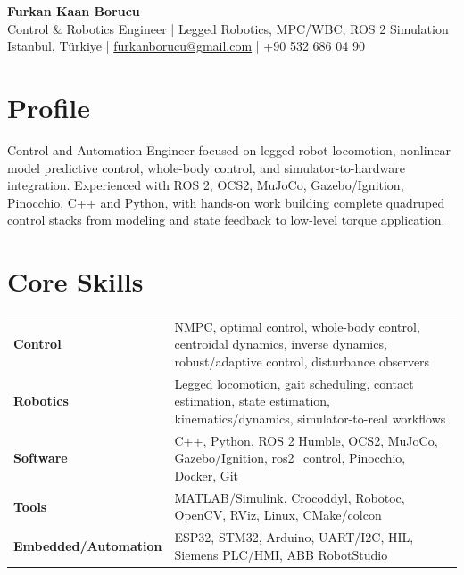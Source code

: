 \documentclass[10pt,a4paper]{article}
\begin{document}
\small

\begin{center}
{\Large \textbf{Furkan Kaan Borucu}}\\[-1pt]
Control \& Robotics Engineer | Legged Robotics, MPC/WBC, ROS 2 Simulation\\[-1pt]
Istanbul, Türkiye \;|\; \href{mailto:furkanborucu@gmail.com}{furkanborucu@gmail.com} \;|\; +90 532 686 04 90
\end{center}
\vspace{-5pt}

\section*{Profile}
Control and Automation Engineer focused on legged robot locomotion, nonlinear model predictive control, whole-body control, and simulator-to-hardware integration. Experienced with ROS 2, OCS2, MuJoCo, Gazebo/Ignition, Pinocchio, C++ and Python, with hands-on work building complete quadruped control stacks from modeling and state feedback to low-level torque application.

\section*{Core Skills}
\begin{tabularx}{\textwidth}{@{}l X@{}}
\textbf{Control} & NMPC, optimal control, whole-body control, centroidal dynamics, inverse dynamics, robust/adaptive control, disturbance observers \\
\textbf{Robotics} & Legged locomotion, gait scheduling, contact estimation, state estimation, kinematics/dynamics, simulator-to-real workflows \\
\textbf{Software} & C++, Python, ROS 2 Humble, OCS2, MuJoCo, Gazebo/Ignition, ros2\_control, Pinocchio, Docker, Git \\
\textbf{Tools} & MATLAB/Simulink, Crocoddyl, Robotoc, OpenCV, RViz, Linux, CMake/colcon \\
\textbf{Embedded/Automation} & ESP32, STM32, Arduino, UART/I2C, HIL, Siemens PLC/HMI, ABB RobotStudio \\
\end{tabularx}
\end{document}
